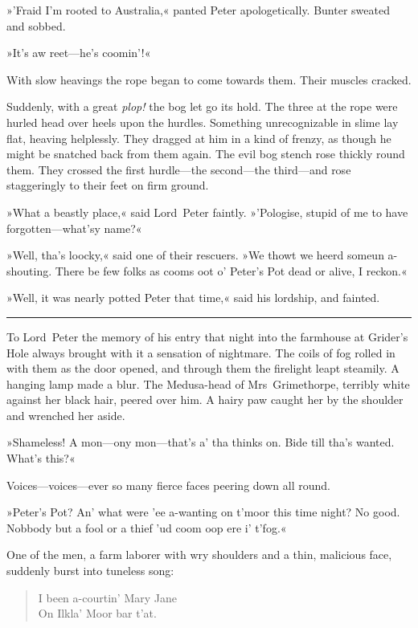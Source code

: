 »'Fraid I'm rooted to Australia,« panted Peter apologetically. Bunter sweated and sobbed.

»It's aw reet—he's coomin'!«

With slow heavings the rope began to come towards them. Their muscles cracked.

Suddenly, with a great \textit{plop!} the bog let go its hold. The three at the rope were hurled head over heels upon the hurdles. Something unrecognizable in slime lay flat, heaving helplessly. They dragged at him in a kind of frenzy, as though he might be snatched back from them again. The evil bog stench rose thickly round them. They crossed the first hurdle—the second—the third—and rose staggeringly to their feet on firm ground.

»What a beastly place,« said Lord~Peter faintly. »'Pologise, stupid of me to have forgotten—what'sy name?«

»Well, tha's loocky,« said one of their rescuers. »We thowt we heerd someun a-shouting. There be few folks as cooms oot o' Peter's Pot dead or alive, I reckon.«

»Well, it was nearly potted Peter that time,« said his lordship, and fainted. 

\noindent\hfil\rule{0.5\textwidth}{.4pt}\hfil 

To Lord~Peter the memory of his entry that night into the farmhouse at Grider's Hole always brought with it a sensation of nightmare.  The coils of fog rolled in with them as the door opened, and through them the firelight leapt steamily. A hanging lamp made a blur. The Medusa-head of Mrs~Grimethorpe, terribly white against her black hair, peered over him. A hairy paw caught her by the shoulder and wrenched her aside.

»Shameless! A mon—ony mon—that's a' tha thinks on. Bide till tha's wanted. What's this?«

Voices—voices—ever so many fierce faces peering down all round.

»Peter's Pot? An' what were 'ee a-wanting on t'moor this time night? No good. Nobbody but a fool or a thief 'ud coom oop ere i' t'fog.«

One of the men, a farm laborer with wry shoulders and a thin, malicious face, suddenly burst into tuneless song: 

\begin{verse}
\begin{altverse}
I been a-courtin' Mary Jane\\
On Ilkla' Moor bar t'at.\\
\end{altverse}
\end{verse}

